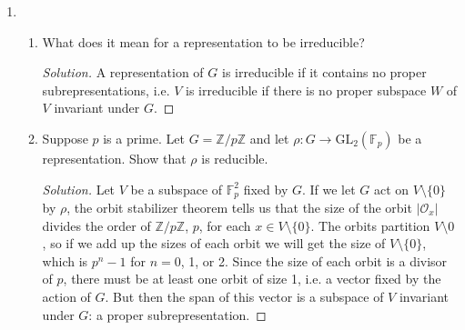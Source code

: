 \documentclass[11pt,letterpaper]{report}
\newcommand{\integers}{\mathbb{Z}}
\newcommand{\mcal}[1]{\mathcal{#1}}
\newenvironment{solution}
{\begin{proof}[Solution]}
{\end{proof}}
\begin{document}
\begin{enumerate}
	\item \begin{enumerate}
		\item What does it mean for a representation to be irreducible?
		\begin{solution}
			A representation of $G$ is irreducible if it contains no proper subrepresentations, i.e. $V$ is irreducible if there is no proper subspace $W$ of $V$ invariant under $G$.
		\end{solution}
		\item Suppose $p$ is a prime. Let $G = \integers/p\integers$ and let $\rho: G\to \text{GL}_2(\mathbb{F}_p)$ be a representation. Show that $\rho$ is reducible.
		\begin{solution}
			Let $V$ be a subspace of $\mathbb{F}_p^2$ fixed by $G$. If we let $G$ act on $V\setminus\{0\}$ by $\rho$, the orbit stabilizer theorem tells us that the size of the orbit $|\mcal{O}_x|$ divides the order of $\integers/p\integers$, $p$, for each $x\in V\setminus \{0\}$. The orbits partition $V\setminus 0$, so if we add up the sizes of each orbit we will get the size of $V\setminus \{0\}$, which is $p^n-1$ for $n=0$, 1, or 2. Since the size of each orbit is a divisor of $p$, there must be at least one orbit of size 1, i.e. a vector fixed by the action of $G$. But then the span of this vector is a subspace of $V$ invariant under $G$: a proper subrepresentation.
		\end{solution}
	\end{enumerate}


\end{enumerate}
\end{document}
